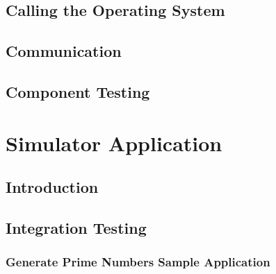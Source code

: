 \documentclass[a4paper,11pt]{report}
\begin{document}
\section{Calling the Operating System}
\section{Communication}
\section{Component Testing}
\chapter{Simulator Application}
\section{Introduction}
\section{Integration Testing}
\subsection{Generate Prime Numbers Sample Application}
\label{primenumbers}
\end{document}
